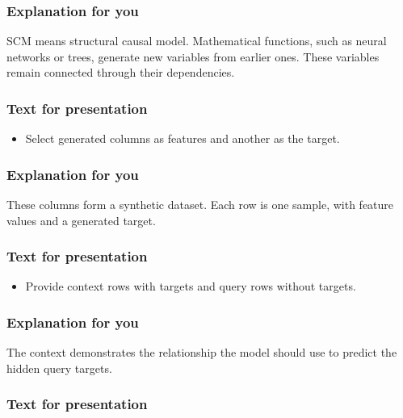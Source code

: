 \documentclass[11pt]{article}
\newenvironment{notes}
  {\begin{itemize}\setlength{\itemsep}{0.45em}\setlength{\parsep}{0pt}}
  {\end{itemize}}
\begin{document}
\subsubsection*{Explanation for you}

SCM means structural causal model. Mathematical functions, such as neural networks or trees,
generate new variables from earlier ones. These variables remain connected through their
dependencies.

\subsubsection*{Text for presentation}

\begin{notes}

    \item Select generated columns as features and another as the target.

\end{notes}

\subsubsection*{Explanation for you}

These columns form a synthetic dataset. Each row is one sample, with feature values and a
generated target.

\subsubsection*{Text for presentation}

\begin{notes}

    \item Provide context rows with targets and query rows without targets.

\end{notes}

\subsubsection*{Explanation for you}

The context demonstrates the relationship the model should use to predict the hidden query
targets.

\subsubsection*{Text for presentation}
\end{document}
